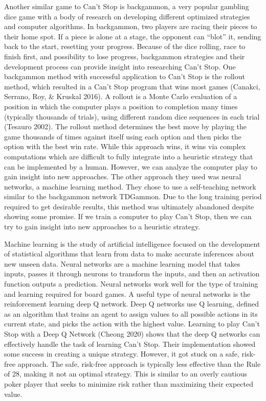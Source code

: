 \documentclass[12pt]{article}
\begin{document}
\begin{thesis}
Another similar game to Can't Stop is backgammon, a very popular gambling dice game with a body of research on developing different optimized strategies and computer algorithms.
In backgammon, two players are racing their pieces to their home spot.
If a piece is alone at a stage, the opponent can ``blot'' it, sending back to the start, resetting your progress.
Because of the dice rolling, race to finish first, and possibility to lose progress, backgammon strategies and their development process can provide insight into researching Can't Stop.
One backgammon method with successful application to Can't Stop is the rollout method, which resulted in a Can't Stop program that wins most games (Canakci, Serrano, Roy, \& Kruskal 2016).
A rollout is a Monte Carlo evaluation of a position in which the computer plays a position to completion many times (typically thousands of trials), using different random dice sequences in each trial (Tesauro 2002).
The rollout method determines the best move by playing the game thousands of times against itself using each option and then picks the option with the best win rate.
While this approach wins, it wins via complex computations which are difficult to fully integrate into a heuristic strategy that can be implemented by a human.
However, we can analyze the computer play to gain insight into new approaches.
The other approach they used was neural networks, a machine learning method.
They chose to use a self-teaching network similar to the backgammon network TDGammon.
Due to the long training period required to get desirable results, this method was ultimately abandoned despite showing some promise.
If we train a computer to play Can't Stop, then we can try to gain insight into new approaches to a heuristic strategy.

Machine learning is the study of artificial intelligence focused on the development of statistical algorithms that learn from data to make accurate inferences about new unseen data.
Neural networks are a machine learning model that takes inputs, passes it through neurons to transform the inputs, and then an activation function outputs a prediction.
Neural networks work well for the type of training and learning required for board games.
A useful type of neural networks is the reinforcement learning deep Q network.
Deep Q networks use Q learning, defined as an algorithm that trains an agent to assign values to all possible actions in its current state, and picks the action with the highest value.
Learning to play Can't Stop with a Deep Q Network (Cheong 2020) shows that the deep Q networks can effectively handle the task of learning Can't Stop.
Their implementation showed some success in creating a unique strategy.
However, it got stuck on a safe, risk-free approach.
The safe, risk-free approach is typically less effective than the Rule of 28, making it not an optimal strategy. This is similar to an overly cautious poker player that seeks to minimize risk rather than maximizing their expected value.


\end{thesis}
\end{document}
